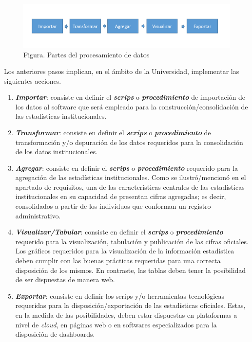 \documentclass[
]{book}
\begin{document}
\begin{figure}
\centering
\includegraphics{imagenes/Figura_1.png}
\caption{Figura. Partes del procesamiento de datos}
\end{figure}

Los anteriores pasos implican, en el ámbito de la Universidad, implementar las siguientes acciones.

\begin{enumerate}
\def\labelenumi{\arabic{enumi}.}
\item
  \textbf{\emph{Importar}}: consiste en definir el \textbf{\emph{scrips}} o \textbf{\emph{procedimiento}} de importación de los datos al software que será empleado para la construcción/consolidación de las estadísticas institucionales.
\item
  \textbf{\emph{Transformar}}: consiste en definir el \textbf{\emph{scrips}} o \textbf{\emph{procedimiento}} de transformación y/o depuración de los datos requeridos para la consolidación de los datos institucionales.
\item
  \textbf{\emph{Agregar}}: consiste en definir el \textbf{\emph{scrips}} o \textbf{\emph{procedimiento}} requerido para la agregación de las estadísticas institucionales. Como se ilustró/mencionó en el apartado de requisitos, una de las características centrales de las estadísticas institucionales en su capacidad de presentan cifras agregadas; es decir, consolidados a partir de los individuos que conforman un registro administrativo.
\item
  \textbf{\emph{Visualizar/Tabular}}: consiste en definir el \textbf{\emph{scrips}} o \textbf{\emph{procedimiento}} requerido para la visualización, tabulación y publicación de las cifras oficiales. Los gráficos requeridos para la visualización de la información estadística deben cumplir con las buenas prácticas requeridas para una correcta disposición de los mismos. En contraste, las tablas deben tener la posibilidad de ser dispuestas de manera web.
\item
  \textbf{\emph{Exportar}}: consiste en definir los scrips y/o herramientas tecnológicas requeridas para la disposición/exportación de las estadísticas oficiales. Estas, en la medida de las posibilidades, deben estar dispuestas en plataformas a nivel de \emph{cloud}, en páginas web o en softwares especializados para la disposición de dashboards.
\end{enumerate}
\end{document}
